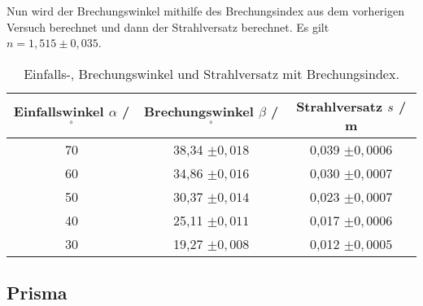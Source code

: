 Nun wird der Brechungswinkel mithilfe des Brechungsindex aus dem vorherigen Versuch berechnet und dann
der Strahlversatz berechnet. Es gilt $n = 1,515 \pm 0,035$.
\begin{table}
  \centering
  \caption{Einfalls-, Brechungswinkel und Strahlversatz mit Brechungsindex.}
  \label{tab:Aufgabe3}
  \begin{tabular}{c c c}
    \toprule
    Einfallswinkel $\alpha$ / $^{\circ}$& Brechungswinkel $\beta$ / $^{\circ}$ & Strahlversatz $s$ / m\\
    \midrule
    70 & 38,34 $\pm 0,018$ & 0,039 $\pm 0,0006$\\
    60 & 34,86 $\pm 0,016$ & 0,030 $\pm 0,0007$\\
    50 & 30,37 $\pm 0,014$ & 0,023 $\pm 0,0007$\\
    40 & 25,11 $\pm 0,011$ & 0,017 $\pm 0,0006$\\
    30 & 19,27 $\pm 0,008$ & 0,012 $\pm 0,0005$\\
    \bottomrule
  \end{tabular}
\end{table}

\subsection{Prisma}